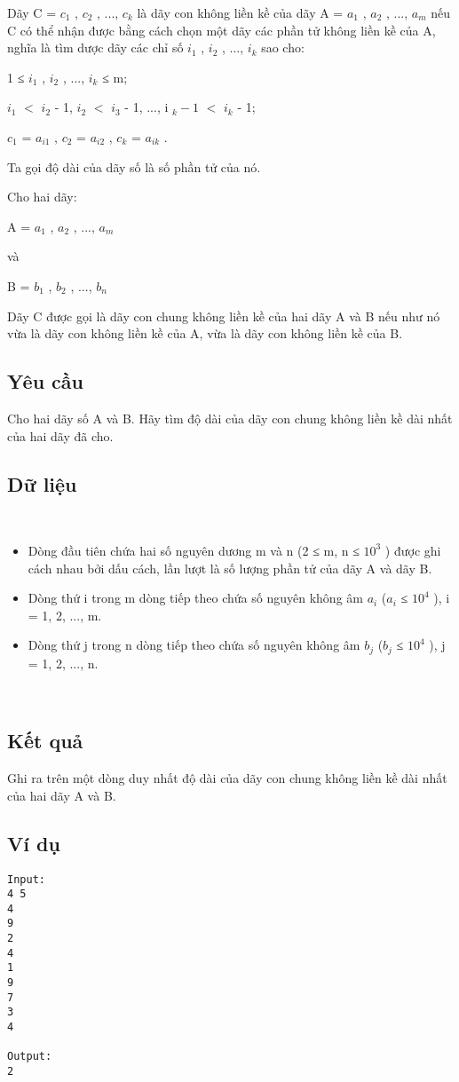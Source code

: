 

Dãy C = $c_{1}$ , $c_{2}$ , ..., $c_{k}$ là dãy con không liền kề của dãy A = $a_{1}$ , $a_{2}$ , ..., $a_{m}$ nếu C có thể nhận được bằng cách chọn một dãy các phần tử không liền kề của A, nghĩa là tìm dược dãy các chỉ số $i_{1}$ , $i_{2}$ , ..., $i_{k}$ sao cho:

1 ≤ $i_{1}$ , $i_{2}$ , ..., $i_{k}$ ≤ m;


$i_{1}$ $<$ $i_{2}$ - 1, $i_{2}$ $<$ $i_{3}$ - 1, ..., i $_ k - 1 $ $<$ $i_{k}$ - 1;


$c_{1}$ = $a_{i1}$ , $c_{2}$ = $a_{i2}$ , $c_{k}$ = $a_{ik}$ .

Ta gọi độ dài của dãy số là số phần tử của nó.

Cho hai dãy:


A = $a_{1}$ , $a_{2}$ , ..., $a_{m}$


và


B = $b_{1}$ , $b_{2}$ , ..., $b_{n}$

Dãy C được gọi là dãy con chung không liền kề của hai dãy A và B nếu như nó vừa là dãy con không liền kề của A, vừa là dãy con không liền kề của B.

\subsection{Yêu cầu}

Cho hai dãy số A và B. Hãy tìm độ dài của dãy con chung không liền kề dài nhất của hai dãy đã cho.

\subsection{Dữ liệu}

 
\begin{itemize}
	\item Dòng đầu tiên chứa hai số nguyên dương m và n (2 ≤ m, n ≤ $10^{3}$ ) được ghi cách nhau bởi dấu cách, lần lượt là số lượng phần tử của dãy A và dãy B.
	\item Dòng thứ i trong m dòng tiếp theo chứa số nguyên không âm $a_{i}$ ($a_{i}$ ≤ $10^{4}$ ), i = 1, 2, ..., m.
	\item Dòng thứ j trong n dòng tiếp theo chứa số nguyên không âm $b_{j}$ ($b_{j}$ ≤ $10^{4}$ ), j = 1, 2, ..., n.
\end{itemize}

 

\subsection{Kết quả}

Ghi ra trên một dòng duy nhất độ dài của dãy con chung không liền kề dài nhất của hai dãy A và B.

\subsection{Ví dụ}
\begin{verbatim}
Input:
4 5
4
9
2
4
1
9
7
3
4

Output:
2
\end{verbatim}
